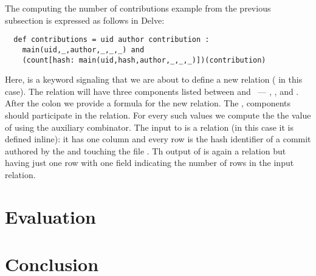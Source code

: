 The computing the number of contributions example from the previous subsection
is expressed as follows in Delve:
\begin{verbatim}
  def contributions = uid author contribution :
    main(uid,_,author,_,_,_) and
    (count[hash: main(uid,hash,author,_,_,_)])(contribution)
\end{verbatim}
Here,  is a keyword signaling that we are about to define a new relation
( in this case). The relation will have three components
listed between \m{=} and \m{:}~--- , , and .
After the colon we provide a formula for the new relation. The ,
 components should participate in the  relation. For every
such values we compute the the value of  using the auxiliary
 combinator. The input to  is a relation (in this case it is
defined inline): it has one column  and every row is the hash
identifier of a commit authored by the  and touching the file
. Th output of  is again a relation but having just one row
with one field indicating the number of rows in the input relation.

\section{Evaluation}

\section{Conclusion}

